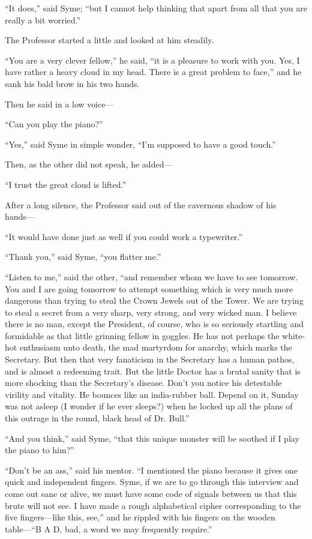 “It does,” said Syme; “but I cannot help thinking that apart from all that you are really a bit worried.”

The Professor started a little and looked at him steadily.

“You are a very clever fellow,” he said, “it is a pleasure to work with you. Yes, I have rather a heavy cloud in my head. There is a great problem to face,” and he sank his bald brow in his two hands.

Then he said in a low voice⁠—

“Can you play the piano?”

“Yes,” said Syme in simple wonder, “I’m supposed to have a good touch.”

Then, as the other did not speak, he added⁠—

“I trust the great cloud is lifted.”

After a long silence, the Professor said out of the cavernous shadow of his hands⁠—

“It would have done just as well if you could work a typewriter.”

“Thank you,” said Syme, “you flatter me.”

“Listen to me,” said the other, “and remember whom we have to see tomorrow. You and I are going tomorrow to attempt something which is very much more dangerous than trying to steal the Crown Jewels out of the Tower. We are trying to steal a secret from a very sharp, very strong, and very wicked man. I believe there is no man, except the President, of course, who is so seriously startling and formidable as that little grinning fellow in goggles. He has not perhaps the white-hot enthusiasm unto death, the mad martyrdom for anarchy, which marks the Secretary. But then that very fanaticism in the Secretary has a human pathos, and is almost a redeeming trait. But the little Doctor has a brutal sanity that is more shocking than the Secretary’s disease. Don’t you notice his detestable virility and vitality. He bounces like an india-rubber ball. Depend on it, Sunday was not asleep (I wonder if he ever sleeps?) when he locked up all the plans of this outrage in the round, black head of Dr. Bull.”

“And you think,” said Syme, “that this unique monster will be soothed if I play the piano to him?”

“Don’t be an ass,” said his mentor. “I mentioned the piano because it gives one quick and independent fingers. Syme, if we are to go through this interview and come out sane or alive, we must have some code of signals between us that this brute will not see. I have made a rough alphabetical cipher corresponding to the five fingers⁠—like this, see,” and he rippled with his fingers on the wooden table⁠—“B A D, bad, a word we may frequently require.”

